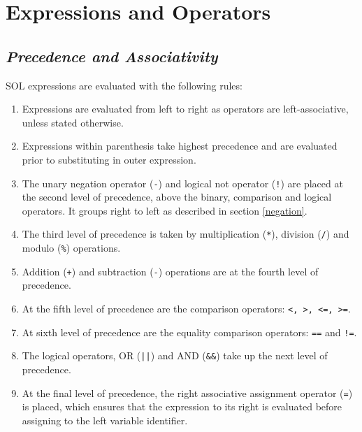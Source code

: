 \section{Expressions and Operators}
    \subsection{\textit{Precedence and Associativity}} \label{precedence}
    SOL expressions are evaluated with the following rules:
    \begin{enumerate}
        \itemsep0em
        \item Expressions are evaluated from left to right as operators are left-associative, unless stated otherwise.

        \item Expressions within parenthesis take highest precedence and are evaluated prior to substituting in outer expression.
        
        \item The unary negation operator (\texttt{-}) and logical not operator (\texttt{!}) are placed at the second level of precedence, above the binary, comparison and logical operators. It groups right to left as described in section \ref{negation}.
        
        \item The third level of precedence is taken by multiplication (\texttt{*}), division (\texttt{/}) and modulo (\texttt{\%}) operations.
        
        \item Addition (\texttt{+}) and subtraction (\texttt{-}) operations are at the fourth level of precedence.
        
        \item At the fifth level of precedence are the comparison operators: \texttt{\textless, \textgreater, \textless=, \textgreater=}.

        \item At sixth level of precedence are the equality comparison operators: \texttt{==} and \texttt{!=}.

        \item The logical operators, OR (\texttt{||}) and AND (\texttt{\&\&}) take up the next level of precedence.

        \item At the final level of precedence, the right associative assignment operator (\texttt{=}) is placed, which ensures that the expression to its right is evaluated before assigning to the left variable identifier.

    \end{enumerate}
    
